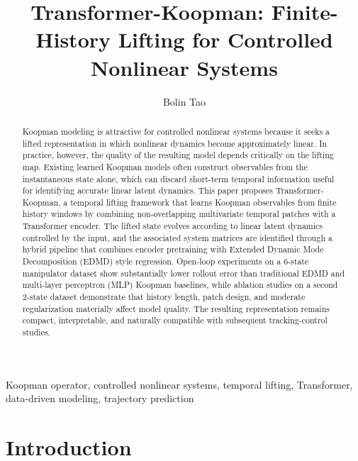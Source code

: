\documentclass[journal]{IEEEtran}
\begin{document}
\title{Transformer-Koopman: Finite-History Lifting for Controlled Nonlinear Systems}

\author{Bolin Tao}


\maketitle

\begin{abstract}
Koopman modeling is attractive for controlled nonlinear systems because it seeks a lifted representation in which nonlinear dynamics become approximately linear. In practice, however, the quality of the resulting model depends critically on the lifting map. Existing learned Koopman models often construct observables from the instantaneous state alone, which can discard short-term temporal information useful for identifying accurate linear latent dynamics. This paper proposes Transformer-Koopman, a temporal lifting framework that learns Koopman observables from finite history windows by combining non-overlapping multivariate temporal patches with a Transformer encoder. The lifted state evolves according to linear latent dynamics controlled by the input, and the associated system matrices are identified through a hybrid pipeline that combines encoder pretraining with Extended Dynamic Mode Decomposition (EDMD) style regression. Open-loop experiments on a 6-state manipulator dataset show substantially lower rollout error than traditional EDMD and multi-layer perceptron (MLP) Koopman baselines, while ablation studies on a second 2-state dataset demonstrate that history length, patch design, and moderate regularization materially affect model quality. The resulting representation remains compact, interpretable, and naturally compatible with subsequent tracking-control studies.
\end{abstract}

\begin{IEEEkeywords}
Koopman operator, controlled nonlinear systems, temporal lifting, Transformer, data-driven modeling, trajectory prediction
\end{IEEEkeywords}

\section{Introduction}
\label{sec:introduction}
\end{document}
